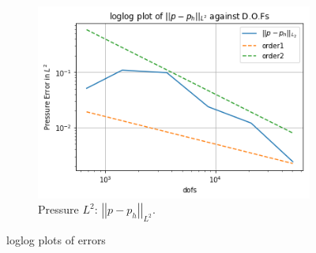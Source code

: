 \documentclass[12pt,a4paper]{article}
\theoremstyle{definition}
\begin{document}
\begin{figure}[H]
\begin{subfigure}[b]{.45\linewidth}
		\includegraphics[width=\linewidth]{p_h_L2}
		\caption{Pressure $L^2$: $\left|\left|p-p_h\right|\right|_{L^2}$.}
		\label{fig_pL2}
	\end{subfigure}
	\caption{loglog plots of errors }
	\label{fig_errors}
\end{figure}
\end{document}

